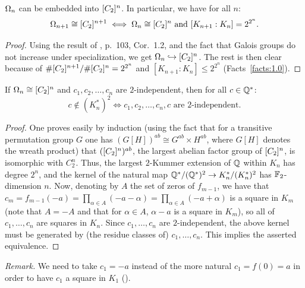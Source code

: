\begin{sharedlemma}
  \label{lem:1.4}
  $\Omega_n$ can be embedded into $[C_2]^{n}$. In particular, we have for all $n$:
  \[ \Omega_{n+1} \cong [C_2]^{n+1} \iff \Omega_n \cong [C_2]^{n} \text{ and } [K_{n+1} : K_n] = 2^{2^n}. \]
\end{sharedlemma}
\begin{proof}
  Using the result of \cite{odoni}, p.~103, Cor.~1.2, and the fact that Galois groups do not
  increase under specialization, we get $\Omega_n \hookrightarrow [C_2]^{n}$. The rest is then clear
  because of $\#[C_2]^{n+1}/\#[C_2]^{n} = 2^{2^n}$ and $[K_{n+1} : K_n] \le 2^{2^n}$
  (Facts~\ref{facts:1.0}).
\end{proof}

\begin{sharedlemma}
  \label{lem:1.5}
  If $\Omega_n \cong [C_2]^{n}$ and $c_1, c_2, \dots, c_n$ are $2$-independent, then for all
  $c \in \mathbb{Q}^*$:
  \[ c \notin (K_n^*)^2 \iff c_1, c_2, \dots, c_n, c \text{ are $2$-independent.} \]
\end{sharedlemma}
\begin{proof}
  One proves easily by induction (using the fact that for a transitive permutation group $G$ one
  has $(G[H])^{ab} \cong G^{ab} \times H^{ab}$, where $G[H]$ denotes the wreath product) that
  $([C_2]^{n})^{ab}$, the largest abelian factor group of $[C_2]^{n}$, is isomorphic with $C_2^n$.
  Thus, the largest $2$-Kummer extension of $\mathbb{Q}$ within $K_n$ has degree $2^n$, and the kernel
  of the natural map $\mathbb{Q}^*/(\mathbb{Q}^*)^2 \to K_n^*/(K_n^*)^2$ has $\mathbb{F}_2$-dimension $n$. Now,
  denoting by $A$ the set of zeros of $f_{m-1}$, we have that
  $c_m = f_{m-1}(-a) = \prod_{\alpha \in A} (-a - \alpha) = \prod_{\alpha \in A} (-a + \alpha)$
  is a square in $K_m$ (note that $A = -A$ and that for $\alpha \in A$, $\alpha - a$ is a square
  in $K_m$), so all of $c_1, \dots, c_n$ are squares in $K_n$. Since $c_1, \dots, c_n$ are
  $2$-independent, the above kernel must be generated by (the residue classes of)
  $c_1, \dots, c_n$. This implies the asserted equivalence.
\end{proof}

\emph{Remark.} We need to take $c_1 = -a$ instead of the more natural $c_1 = f(0) = a$ in order
to have $c_1$ a square in $K_1$ ().

